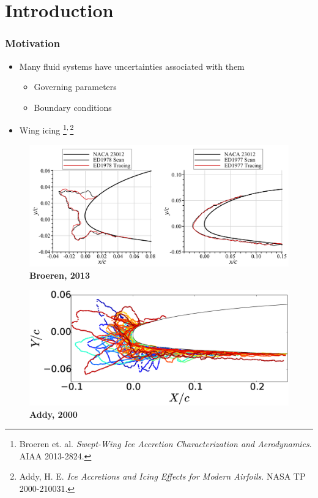 \documentclass[9pt]{beamer}
\begin{document}
\section{Introduction}
\label{sec-1}
\begin{frame}
\frametitle{Motivation}
\label{sec-1-1}

\begin{itemize}
\item Many fluid systems have uncertainties associated with them
\begin{itemize}
\item Governing parameters
\item Boundary conditions
\end{itemize}
\item Wing icing \footnote{Broeren et. al. \emph{Swept-Wing Ice Accretion Characterization and Aerodynamics}. AIAA 2013-2824.
 }\textsuperscript{,}\,\footnote{Addy, H. E. \emph{Ice Accretions and Icing Effects for Modern Airfoils}. NASA TP 2000-210031.
 }
\end{itemize}
\begin{figure}[ht]
\centering
\begin{minipage}[b]{0.45\linewidth}
\includegraphics[width=1\textwidth]{SampleIceShapes} \\
\centering
\textbf{Broeren, 2013} \\
\end{minipage}
\begin{minipage}[b]{0.45\linewidth}
\includegraphics[width=1\textwidth]{Dataset} \\
\centering
\textbf{Addy, 2000}
\end{minipage}
\end{figure}
\end{frame}
\end{document}
